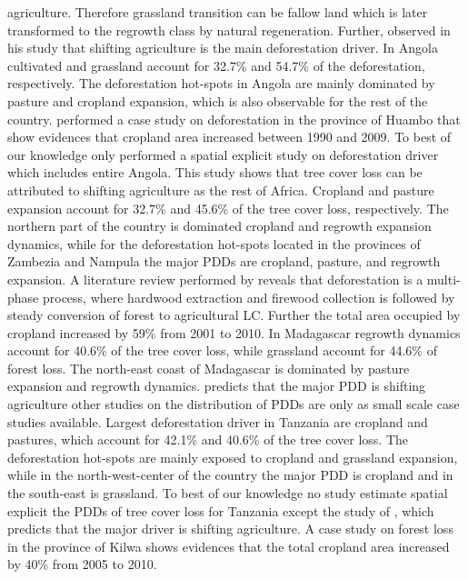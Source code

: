 agriculture. Therefore grassland transition can be fallow land which is later transformed to the regrowth class by natural regeneration. Further, \citeauthor{Curtis2018} observed in his study that shifting agriculture is the main deforestation driver. In Angola cultivated and grassland account for 32.7\% and 54.7\% of the deforestation, respectively. The deforestation hot-spots in Angola are mainly dominated by pasture and cropland expansion, which is also observable for the rest of the country. \citet{Cabral2011} performed a case study on deforestation in the province of Huambo that show evidences that cropland area increased between 1990 and 2009. To best of our knowledge only \citet{Curtis2018} performed a spatial explicit study on deforestation driver which includes entire Angola. This study shows that tree cover loss can be attributed to shifting agriculture as the rest of Africa. Cropland and pasture expansion account for 32.7\% and 45.6\% of the tree cover loss, respectively. The northern part of the country is dominated cropland and regrowth expansion dynamics, while for the deforestation hot-spots located in the provinces of Zambezia and Nampula the major \acp{PDD} are cropland, pasture, and regrowth expansion. A literature review performed by \citet{Sitoe2012} reveals that deforestation is a multi-phase process, where hardwood extraction and firewood collection is followed by steady conversion of forest to agricultural \ac{LC}. Further the total area occupied by cropland increased by 59\% from 2001 to 2010. In Madagascar regrowth dynamics account for 40.6\% of the tree cover loss, while grassland account for 44.6\% of forest loss. The north-east coast of Madagascar is dominated by pasture expansion and regrowth dynamics. \citet{Curtis2018} predicts that the major \ac{PDD} is shifting agriculture other studies on the distribution of \acp{PDD} are only as small scale case studies available. Largest deforestation driver in Tanzania are cropland and pastures, which account for 42.1\% and 40.6\% of the tree cover loss. The deforestation hot-spots are mainly exposed to cropland and grassland expansion, while in the north-west-center of the country the major \ac{PDD} is cropland and in the south-east is grassland. To best of our knowledge no study estimate spatial explicit the \acp{PDD} of tree cover loss for Tanzania except the study of \citet{Curtis2018}, which predicts that the major driver is shifting agriculture. A case study on forest loss in the province of Kilwa shows evidences that the total cropland area increased by 40\% from 2005 to 2010.
